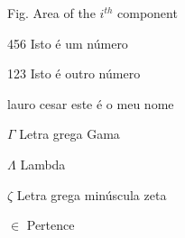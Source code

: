 \documentclass[
	12pt,				%
	oneside,          %
	a4paper,			%
	chapter=TITLE,		%
	section=TITLE,		%
	subsection=TITLE,	%
	english,			%
	brazil,				%
	]{abntUnoesc}
\begin{document}
\frenchspacing 

\imprimircapa

\imprimirfolhaderosto









\listoffigures*
\cleardoublepage


\listoftables*
\cleardoublepage  %

\begin{siglas}
  \item[Fig.] Area of the $i^{th}$ component
  \item[456] Isto é um número
  \item[123] Isto é outro número
  \item[lauro cesar] este é o meu nome
\end{siglas}

\begin{simbolos}
  \item[$ \Gamma $] Letra grega Gama
  \item[$ \Lambda $] Lambda
  \item[$ \zeta $] Letra grega minúscula zeta
  \item[$ \in $] Pertence
\end{simbolos}

\tableofcontents*
\cleardoublepage

\textual






\postextual




\end{document}
